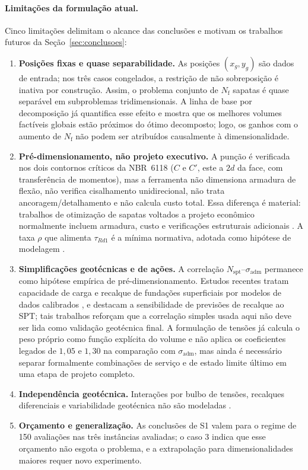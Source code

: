 \paragraph{Limitações da formulação atual.}
Cinco limitações delimitam o alcance das conclusões e motivam os trabalhos futuros da Seção~\ref{sec:conclusoes}:
\begin{enumerate}
    \item \textbf{Posições fixas e quase separabilidade.} As posições $(x_g, y_g)$ são dados de entrada; nos três casos congelados, a restrição de não sobreposição é inativa por construção. Assim, o problema conjunto de $N_{\mathrm{f}}$ sapatas é quase separável em subproblemas tridimensionais. A linha de base por decomposição já quantifica esse efeito e mostra que os melhores volumes factíveis globais estão próximos do ótimo decomposto; logo, os ganhos com o aumento de $N_{\mathrm{f}}$ não podem ser atribuídos causalmente à dimensionalidade.
    \item \textbf{Pré-dimensionamento, não projeto executivo.} A punção é verificada nos dois contornos críticos da NBR~6118 ($C$ e $C'$, este a $2d$ da face, com transferência de momentos), mas a ferramenta não dimensiona armadura de flexão, não verifica cisalhamento unidirecional, não trata ancoragem/detalhamento e não calcula custo total. Essa diferença é material: trabalhos de otimização de sapatas voltados a projeto econômico normalmente incluem armadura, custo e verificações estruturais adicionais . A taxa $\rho$ que alimenta $\tau_{Rd1}$ é a mínima normativa, adotada como hipótese de modelagem .
    \item \textbf{Simplificações geotécnicas e de ações.} A correlação $N_{\mathrm{spt}}$--$\sigma_{\mathrm{adm}}$ permanece como hipótese empírica de pré-dimensionamento. Estudos recentes tratam capacidade de carga e recalque de fundações superficiais por modelos de dados calibrados , e  destacam a sensibilidade de previsões de recalque ao SPT; tais trabalhos reforçam que a correlação simples usada aqui não deve ser lida como validação geotécnica final. A formulação de tensões já calcula o peso próprio como função explícita do volume e não aplica os coeficientes legados de $1{,}05$ e $1{,}30$ na comparação com $\sigma_{\mathrm{adm}}$, mas ainda é necessário separar formalmente combinações de serviço e de estado limite último em uma etapa de projeto completo.
    \item \textbf{Independência geotécnica.} Interações por bulbo de tensões, recalques diferenciais e variabilidade geotécnica não são modeladas .
    \item \textbf{Orçamento e generalização.} As conclusões de S1 valem para o regime de 150 avaliações nas três instâncias avaliadas; o caso 3 indica que esse orçamento não esgota o problema, e a extrapolação para dimensionalidades maiores requer novo experimento.
\end{enumerate}

